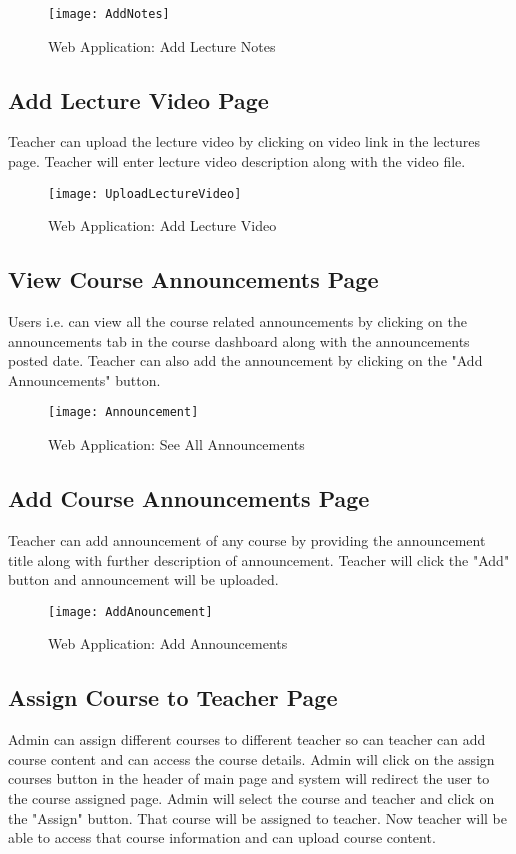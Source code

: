 \begin{figure}[h]
  \centering
  \texttt{[image: AddNotes]}
  \caption{Web Application: Add Lecture Notes}
\end{figure}

\subsection{Add Lecture Video Page}
Teacher can upload the lecture video by clicking on video link in the lectures page. Teacher will enter lecture video description along with the video file.

\begin{figure}[h]
  \centering
  \texttt{[image: UploadLectureVideo]}
  \caption{Web Application: Add Lecture Video}
\end{figure}

\subsection{View Course Announcements Page}
Users i.e. can view all the course related announcements by clicking on the announcements tab in the course dashboard along with the announcements posted date.  Teacher can also add the announcement by clicking on the "Add Announcements" button. 

\begin{figure}[h]
  \centering
  \texttt{[image: Announcement]}
  \caption{Web Application: See All Announcements}
\end{figure}

\subsection{Add Course Announcements Page}
Teacher can add announcement of any course by providing the announcement title along with further description of announcement. Teacher will click the "Add" button and announcement will be uploaded.

\begin{figure}[h]
  \centering
  \texttt{[image: AddAnouncement]}
  \caption{Web Application: Add Announcements}
\end{figure}


\subsection{Assign Course to Teacher Page}
Admin can assign different courses to different teacher so can teacher can add course content and can access the course details. Admin will click on the assign courses button in the header of main page and system will redirect the user to the course assigned page. Admin will select the course and teacher and click on the "Assign" button. That course will be assigned to teacher. Now teacher will be able to access that course information and can upload course content.

